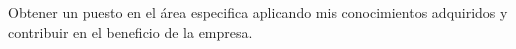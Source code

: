 \documentclass[10pt]{article}
\begin{document}









Obtener un puesto en el área  especifica  aplicando mis conocimientos adquiridos y contribuir en el beneficio de la empresa.
\end{document}
